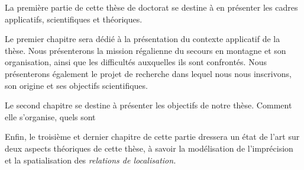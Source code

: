 La première partie de cette thèse de doctorat se destine à en
présenter les cadres applicatifs, scientifiques et théoriques.

Le premier chapitre sera dédié à la présentation du contexte
applicatif de la thèse. Nous présenterons la mission régalienne du
secours en montagne et son organisation, ainsi que les difficultés
auxquelles ils sont confrontés.
%
Nous présenterons également le projet de recherche dans lequel nous
nous inscrivons, son origine et ses objectifs scientifiques.

Le second chapitre se destine à présenter les objectifs de notre
thèse. Comment elle s'organise, quels sont

Enfin, le troisième et dernier chapitre de cette partie dressera un
état de l'art sur deux aspects théoriques de cette thèse, à savoir la
modélisation de l'imprécision et la spatialisation des \emph{relations
  de localisation.}

